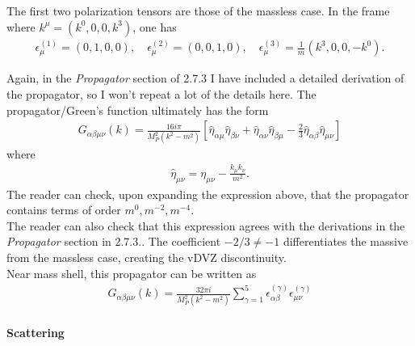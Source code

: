 \documentclass{book}
\theoremstyle{definition}
\newcommand{\al}{\alpha}
\newcommand{\be}{\beta}
\newcommand{\f}[2]{\frac{#1}{#2}}
\newcommand{\lb}{\left[}
\newcommand{\rb}{\right]}
\begin{document}
\begin{framed}
	The first two polarization tensors are those of the massless case. In the frame where $k^\mu = (k^0,0,0,k^3)$, one has
	\begin{align}
	\epsilon_\mu^{(1)} = (0,1,0,0), \quad \epsilon_\mu^{(2)} = (0,0,1,0), \quad \epsilon_\mu^{(3)} = \f{1}{m}(k^3,0,0,-k^0).
	\end{align}
	
	
	Again, in the \textit{Propagator} section of 2.7.3 I have included a detailed derivation of the propagator, so I won't repeat a lot of the details here. The propagator/Green's function ultimately has the form
	\begin{align}
	\boxed{G_{\al\be\mu\nu}(k) = \f{16i\pi }{M_P^2(k^2 - m^2)} \lb \hat{\eta}_{\al\mu}\hat{\eta}_{\be\nu} + \hat{\eta}_{\al\nu}\hat{\eta}_{\be\mu} - \f{2}{3}\hat{\eta}_{\al\be}\hat{\eta}_{\mu\nu} \rb }
	\end{align}
	where
	\begin{align}
	\hat{\eta}_{\mu\nu} = \eta_{\mu\nu} - \f{k_\mu k_\nu}{m^2}.
	\end{align}
	The reader can check, upon expanding the expression above, that the propagator contains terms of order $m^0, m^{-2}, m^{-4}$. \\
	
	
	
	
	The reader can also check that this expression agrees with the derivations in the \textit{Propagator} section in 2.7.3.. The coefficient $-2/3 \neq -1$ differentiates the massive from the massless case, creating the vDVZ discontinuity. \\
	
	
	
	Near mass shell, this propagator can be written as
	\begin{align}
	\boxed{G_{\al\be\mu\nu}(k) = \f{32\pi i}{M_P^2(k^2 - m^2)}\sum^5_{\gamma=1}\epsilon_{\al\be}^{(\gamma)}\epsilon_{\mu\nu}^{(\gamma)}}
	\end{align}
	
	
	
	
	
		
	
	\paragraph{Scattering}$\,$\\
	

\end{framed}
\end{document}
